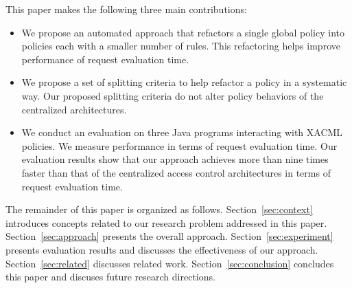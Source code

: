 
This paper makes the following three main contributions:
\begin{itemize}
\item We propose an automated approach that refactors a single global policy into policies each with a smaller number of rules. This
refactoring helps improve performance of request evaluation time.
\item We propose a set of splitting criteria to help refactor a policy in a systematic way. Our proposed splitting criteria do not alter policy behaviors of the centralized architectures.
\item We conduct an evaluation on three Java programs interacting with XACML policies. We measure performance in terms
of request evaluation time.
Our evaluation results show that our approach achieves more than nine times faster than that of the centralized access control architectures in terms of request evaluation time.
\end{itemize}


The remainder of this paper is organized as follows. Section~\ref{sec:context} introduces concepts related to our research problem addressed in this paper.
Section~\ref{sec:approach} presents the overall approach.
Section~\ref{sec:experiment} presents evaluation results and discusses the effectiveness of our approach. Section~\ref{sec:related} discusses related work.
Section~\ref{sec:conclusion} concludes this paper and discuses future research directions.

